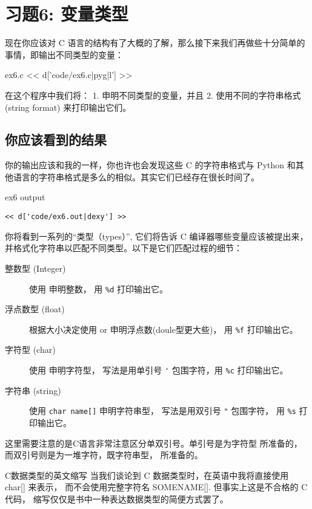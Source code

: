 \chapter{习题6: 变量类型}

现在你应该对 C 语言的结构有了大概的了解，那么接下来我们再做些十分简单的事情，即输出不同类型的变量：

\begin{code}{ex6.c}
<< d['code/ex6.c|pyg|l'] >>
\end{code}

在这个程序中我们将：
1. 申明不同类型的变量，并且
2. 使用不同的字符串格式(string format)  来打印输出它们。


\section{你应该看到的结果}

你的输出应该和我的一样，你也许也会发现这些 C 的字符串格式与 Python 和其他语言的字符串格式是多么的相似。其实它们已经存在很长时间了。

\begin{code}{ex6 output}
\begin{lstlisting}
<< d['code/ex6.out|dexy'] >>
\end{lstlisting}
\end{code}

你将看到一系列的“类型（types）”, 它们将告诉 C 编译器哪些变量应该被提出来，并格式化字符串以匹配不同类型。以下是它们匹配过程的细节：

\begin{description}
\item[整数型 (Integer) ] 使用  申明整数， 用 \verb|%d| 打印输出它。
\item[浮点数型 (float)] 根据大小决定使用  or  申明浮点数(doule型更大些)， 用 \verb|%f| 打印输出它。
\item[字符型 (char)] 使用  申明字符型， 写法是用单引号 \verb|'| 包围字符，用 \verb|%c| 打印输出它。
\item[字符串 (string)] 使用 \verb|char name[]| 申明字符串型， 写法是用双引号 \verb|"| 包围字符， 用 \verb|%s| 打印输出它。 
\end{description}

这里需要注意的是C语言非常注意区分单双引号。单引号是为字符型  所准备的，而双引号则是为一堆字符，既字符串型，  所准备的。

\begin{aside}{C数据类型的英文缩写}
当我们谈论到 C 数据类型时，在英语中我将直接使用 char[] 来表示， 而不会使用完整字符名 SOMENAME[]. 但事实上这是不合格的 C 代码， 缩写仅仅是书中一种表达数据类型的简便方式罢了。
\end{aside}

